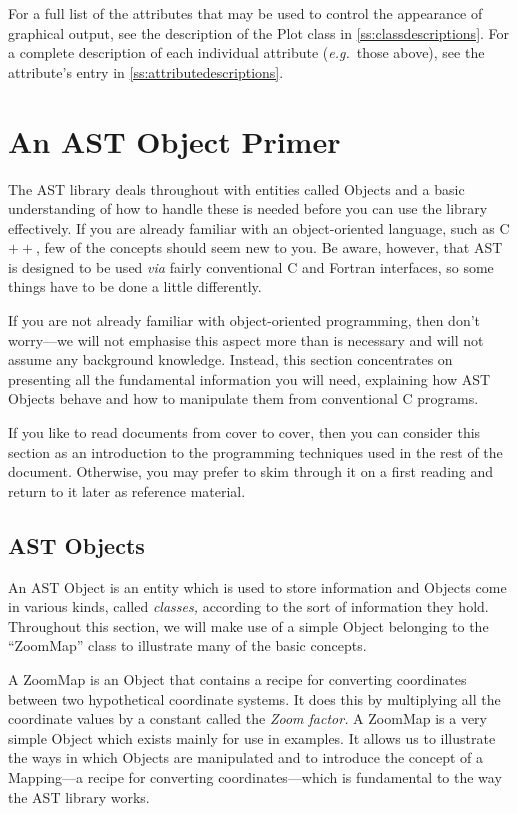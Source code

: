 \documentclass[twoside,11pt]{article}
\newcommand{\htmlref}[2]{#1}
\newcommand{\appref}[1]{Appendix~\ref{#1}}
\renewcommand{\appref}[1]{\ref{#1}}
\begin{document}
For a full list of the attributes that may be used to control the
appearance of graphical output, see the description of the Plot class
in \appref{ss:classdescriptions}. For a complete description of each
individual attribute ({\em{e.g.}}\ those above), see the attribute's
entry in \appref{ss:attributedescriptions}.

\cleardoublepage
%
\section{\label{ss:primer}An AST Object Primer}

The AST library deals throughout with entities called Objects and a
basic understanding of how to handle these is needed before you can
use the library effectively.  If you are already familiar with an
object-oriented language, such as C$++$, few of the concepts should
seem new to you.  Be aware, however, that AST is designed to be used
{\em{via}} fairly conventional C and Fortran interfaces, so some
things have to be done a little differently.

If you are not already familiar with object-oriented programming, then
don't worry---we will not emphasise this aspect more than is necessary
and will not assume any background knowledge.  Instead, this section
concentrates on presenting all the fundamental information you will
need, explaining how AST Objects behave and how to manipulate them
from conventional C programs.

If you like to read documents from cover to cover, then you can
consider this section as an introduction to the programming techniques
used in the rest of the document. Otherwise, you may prefer to skim
through it on a first reading and return to it later as reference
material.

\subsection{AST Objects}

An AST \htmlref{Object}{Object} is an entity which is used to store information and
Objects come in various kinds, called {\em{classes,}} according to the
sort of information they hold. Throughout this section, we will make
use of a simple Object belonging to the ``\htmlref{ZoomMap}{ZoomMap}'' class to
illustrate many of the basic concepts.

A ZoomMap is an Object that contains a recipe for converting
coordinates between two hypothetical coordinate systems.  It does this
by multiplying all the coordinate values by a constant called the
{\em{\htmlref{Zoom}{Zoom} factor.}}  A ZoomMap is a very simple Object which exists
mainly for use in examples. It allows us to illustrate the ways in
which Objects are manipulated and to introduce the concept of a
\htmlref{Mapping}{Mapping}---a recipe for converting coordinates---which is fundamental
to the way the AST library works.
\end{document}

